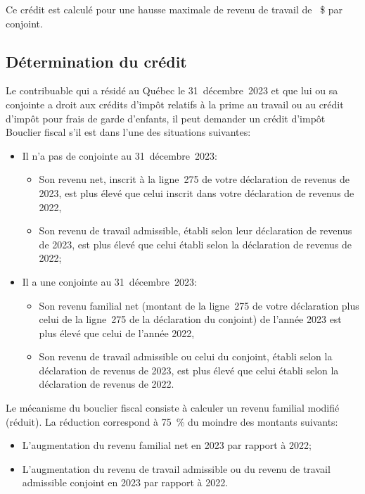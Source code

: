 Ce crédit est calculé pour une hausse maximale de revenu de travail de ~\$ par conjoint.


\subsection{Détermination du crédit}
Le contribuable qui a résidé au Québec le 31~décembre~2023 et que lui ou sa conjointe a droit aux crédits d'impôt relatifs à la prime au travail ou au crédit d'impôt pour frais de garde d'enfants, il peut demander un crédit d'impôt Bouclier fiscal s'il est dans l'une des situations suivantes:
\begin{itemize}
	\item Il n'a pas de conjointe au 31~décembre~2023:
	\begin{itemize}
		\item Son revenu net, inscrit à la ligne~275 de votre déclaration de revenus de 2023, est plus élevé que celui inscrit dans votre déclaration de revenus de 2022,
		\item Son revenu de travail admissible, établi selon leur déclaration de revenus de 2023, est plus élevé que celui établi selon la déclaration de revenus de 2022;
	\end{itemize}
	\item Il a une conjointe au 31~décembre~2023:
	\begin{itemize}
		\item Son revenu familial net (montant de la ligne~275 de votre déclaration plus celui de la ligne~275 de la déclaration du conjoint) de l'année 2023 est plus élevé que celui de l'année 2022,
		\item Son revenu de travail admissible ou celui du conjoint, établi selon la déclaration de revenus de 2023, est plus élevé que celui établi selon la déclaration de revenus de 2022.
	\end{itemize}
\end{itemize}

Le mécanisme du bouclier fiscal consiste à calculer un revenu familial modifié (réduit). La réduction correspond à 75~\% du moindre des montants suivants:
\begin{itemize}
	\item L'augmentation du revenu familial net en 2023 par rapport à 2022;
	\item L'augmentation du revenu de travail admissible ou du revenu de travail admissible conjoint en 2023 par rapport à 2022.
\end{itemize}

